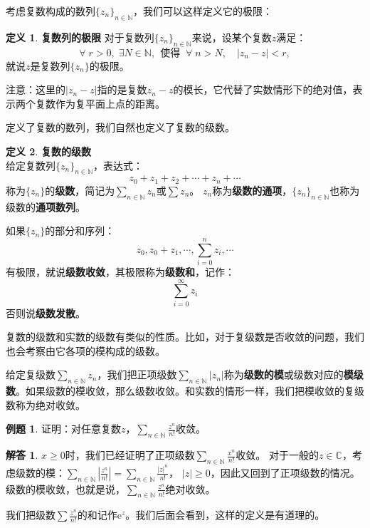 \documentclass[12pt,UTF8]{ctexbook}
\newcommand{\e}{\mathrm{e}}
\theoremstyle{definition}
\newtheorem{df}{定义}[section]
\newtheorem{et}{例题}[section]
\newtheorem*{so}{解答}
\theoremstyle{plain}
\begin{document}
考虑复数构成的数列$\{z_n\}_{n\in\mathbb{N}}$，我们可以这样定义它的极限：
\begin{df}{\textbf{复数列的极限}}
    对于复数列$\{z_n\}_{n\in\mathbb{N}}$来说，设某个复数$z$满足：
    $$ \forall \;r > 0 ,\; \exists N\in \mathbb{N},\;\, \mbox{使得}\;\; \forall \; n>N, \quad | z_n - z | < r, $$
    就说$z$是复数列$\{z_n\}$的极限。

\end{df}

注意：这里的$|z_n - z|$指的是复数$z_n - z$的模长，它代替了实数情形下的绝对值，表示两个复数作为复平面上点的距离。

定义了复数的数列，我们自然也定义了复数的级数。
\begin{df}{\textbf{复数的级数}}
    \mbox{} \\
    给定复数列$\{z_n\}_{n\in\mathbb{N}}$，表达式：
    $$ z_0 + z_1 + z_2 + \cdots + z_n + \cdots $$
    称为$\{z_n\}$的\textbf{级数}，简记为$\sum_{n\in\mathbb{N}} z_n$或$\sum z_n$。
    $z_n$称为\textbf{级数的通项}，$\{z_n\}_{n\in\mathbb{N}}$也称为级数的\textbf{通项数列}。
    
    如果$\{z_n\}$的部分和序列：
    $$ z_0, z_0 + z_1, \cdots , \sum_{i=0}^n z_i, \cdots $$
    有极限，就说\textbf{级数收敛}，其极限称为\textbf{级数和}，记作：
    $$ \sum_{i=0}^\infty z_i $$
    否则说\textbf{级数发散}。
    
\end{df}

复数的级数和实数的级数有类似的性质。比如，对于复级数是否收敛的问题，我们也会考察由它各项的模构成的级数。

给定复级数$\sum_{n\in\mathbb{N}} z_n$，我们把正项级数$\sum_{n\in\mathbb{N}} |z_n|$称为\textbf{级数的模}或级数对应的\textbf{模级数}。如果级数的模收敛，那么级数收敛。和实数的情形一样，我们把模收敛的复级数称为绝对收敛。

\begin{et}
    证明：对任意复数$z$，$\sum_{n\in\mathbb{N}}\frac{z^{n}}{n!}$收敛。
\end{et}
\begin{so}
    $x\geqslant 0$时，我们已经证明了正项级数$\sum_{n\in\mathbb{N}}\frac{x^{n}}{n!}$收敛。
    对于一般的$z\in\mathbb{C}$，考虑级数的模：$\sum_{n\in\mathbb{N}}\left|\frac{z^{n}}{n!}\right| = \sum_{n\in\mathbb{N}}\frac{|z|^{n}}{n!}$，
    $|z|\geqslant 0$，因此又回到了正项级数的情况。级数的模收敛，也就是说，$\sum_{n\in\mathbb{N}}\frac{z^{n}}{n!}$绝对收敛。
\end{so}

我们把级数$\sum \frac{z^{n}}{n!}$的和记作$\e^{z}$。我们后面会看到，这样的定义是有道理的。
\end{document}
